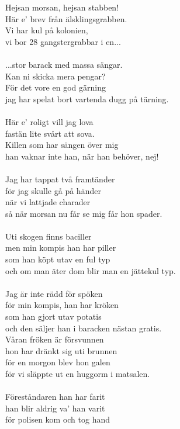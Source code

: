 \vspace{10pt}
Hejsan morsan, hejsan stabben!\\
Här e' brev från älsklingsgrabben.\\
Vi har kul på kolonien,\\
vi bor 28 gangstergrabbar i en...\\
\\
...stor barack med massa sängar.\\
Kan ni skicka mera pengar?\\
För det vore en god gärning\\
jag har spelat bort vartenda dugg på tärning.\\
\\
Här e' roligt vill jag lova\\
fastän lite svårt att sova.\\
Killen som har sängen över mig\\
han vaknar inte han, när han behöver, nej!\\
\\
Jag har tappat två framtänder\\
för jag skulle gå på händer\\
när vi lattjade charader\\
så när morsan nu får se mig får hon spader.\\
\\
Uti skogen finns baciller\\
men min kompis han har piller\\
som han köpt utav en ful typ\\
och om man äter dom blir man en jättekul typ.\\
\\
Jag är inte rädd för spöken\\
för min kompis, han har kröken\\
som han gjort utav potatis\\
och den säljer han i baracken nästan gratis.\\
Våran fröken är försvunnen\\
hon har dränkt sig uti brunnen\\
för en morgon blev hon galen\\
för vi släppte ut en huggorm i matsalen.\\
\\
Föreståndaren han har farit\\
han blir aldrig va' han varit\\
för polisen kom och tog hand\\
